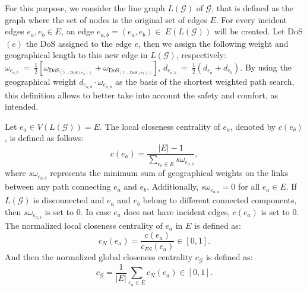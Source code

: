 \documentclass[lettersize,journal]{IEEEtran}
\begin{document}
For this purpose, we consider the line graph $L(\mathcal{G})$ of $\mathcal{G}$, that is defined as the graph where the set of nodes is the original set of edges $E$. For every incident edges $e_{a}, e_{b} \in E$, an edge $e_{a,b}=(e_a, e_b) \in~E(L(\mathcal{G}))$ will be created. Let DoS$(e)$ the DoS  assigned to the edge $e$, then we assign the following weight and geographical length to this new edge in $L(\mathcal{G})$, respectively: $\omega_{e_{a,b}}~=~\frac{1}{2}\left[\omega_{\text{DoS}_{(7-\text{DoS}(e_a))}} + \omega_{\text{DoS}_{(7-\text{DoS}(e_b))}} \right]$, $d_{e_{a,b}}~=~\frac{1}{2}(d_{e_a} + d_{e_b})$. By using the geographical weight $d_{e_{a,b}} \cdot \omega_{e_{a,b}}$ as the basis of the shortest weighted path search, this definition allows to better take into account the safety and comfort, as intended.



Let $e_{a} \in V(L(\mathcal{G}))=E$. The local closeness centrality of $e_{a}$, denoted by $c(e_{b})$, is defined as follows:
\begin{equation} \nonumber
\label{closeness_metric}
c(e_{a}) = \frac{|E|-1}{\sum_{e_{b} \in E} s \omega_{e_{a,b}}},
\end{equation}
where $s \omega_{e_{a,b}}$ represents the minimum sum of geographical weights on the links between any path connecting $e_{a}$ and $e_{b}$. Additionally, $s \omega_{e_{a,a}} = 0$ for all $e_{a} \in E$. If $L(\mathcal{G})$ is disconnected and $e_{a}$ and $e_{b}$ belong to different connected components, then $s \omega_{e_{a,b}}$ is set to $0$. In case $e_{a}$ does not have incident edges, $c(e_{a})$ is set to $0$. The normalized local closeness centrality of $e_{a}$ in $E$ is defined as:
\begin{equation} \nonumber
    c_{N}(e_{a}) = \frac{c(e_{a})}{ c_{FS}(e_{a})} \in \left [0,1 \right].
\end{equation}
And then the normalized global closeness centrality $c_{\mathcal{G}}$ is defined as:
\begin{equation} \nonumber
    c_{\mathcal{G}} = \frac{1}{|E|} \sum_{e_{a} \in E} c_{N}(e_{a})\in \left [ 0,1 \right].
\end{equation}
\end{document}
